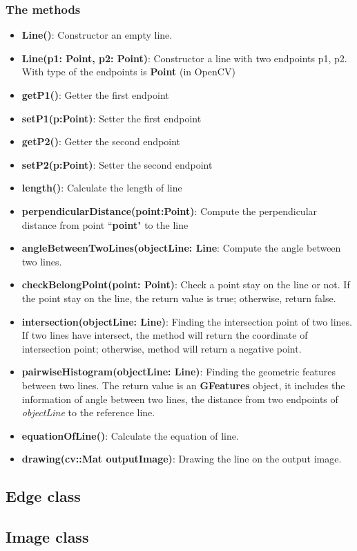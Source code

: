 \subsubsection{The methods}
\begin{itemize}
\item\textbf{Line()}: Constructor an empty line.
\item\textbf{Line(p1: Point, p2: Point)}: Constructor a line with two endpoints p1, p2. With type of the endpoints is \textbf{Point} (in OpenCV)
\item\textbf{getP1()}: Getter the first endpoint 
\item\textbf{setP1(p:Point)}: Setter the first endpoint
\item\textbf{getP2()}: Getter the second endpoint 
\item\textbf{setP2(p:Point)}: Setter the second endpoint
\item\textbf{length()}: Calculate the length of line
\item\textbf{perpendicularDistance(point:Point)}: Compute the perpendicular distance from point ``\textbf{point}" to the line
\item\textbf{angleBetweenTwoLines(objectLine: Line}: Compute the angle between two lines.
\item\textbf{checkBelongPoint(point: Point)}: Check a point stay on the line or not. If the point stay on the line, the return value is true; otherwise, return false.
\item\textbf{intersection(objectLine: Line)}: Finding the intersection point of two lines. If two lines have intersect, the method will return the coordinate of intersection point; otherwise, method will return a negative point.
\item\textbf{pairwiseHistogram(objectLine: Line)}: Finding the geometric features between two lines. The return value is an \textbf{GFeatures} object, it includes the information of angle between two lines, the distance from two endpoints of \textit{objectLine} to the reference line.
\item\textbf{equationOfLine()}: Calculate the equation of line. 
\item\textbf{drawing(cv::Mat outputImage)}: Drawing the line on the output image.
\end{itemize}
\subsection{Edge class}
\subsection{Image class}
